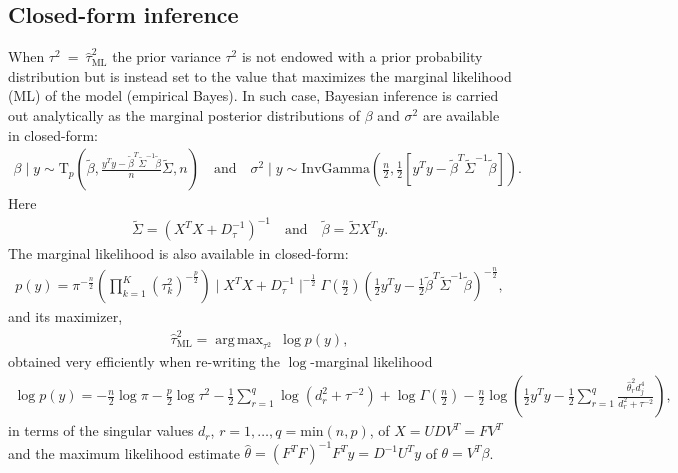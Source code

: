 \documentclass[nojss]{jss}
\DeclareMathOperator*{\argmax}{arg\,max}
\begin{document}
\subsection{Closed-form inference}

When $\tau^2 \ =\  \hat{\tau}_{\mathrm{ML}}^2$ the prior variance $\tau^2$ is
not endowed with a prior probability distribution but is instead set to the
value that maximizes the marginal likelihood (ML) of the model (empirical Bayes).
In such case, Bayesian inference is carried out analytically as the marginal
posterior distributions of $\beta$ and $\sigma^2$ are available in closed-form:
\begin{eqnarray*}
\beta \mid y \sim \mathrm{T}_p \left( \tilde{\beta} ,  \frac{y^T y - \tilde{\beta}^T \tilde{\Sigma}^{-1} \tilde{\beta}}{n} \tilde{\Sigma}, n\right) \quad \mathrm{and} \quad \sigma^2 \mid y \sim \mathrm{InvGamma} \left( \frac{n}{2} , \frac{1}{2} \left[ y^T y - \tilde{\beta}^T \tilde{\Sigma}^{-1} \tilde{\beta} \right] \right).
\end{eqnarray*}
Here
\begin{eqnarray*}
  \tilde{\Sigma} = \left( X^T X + D_{\tau}^{-1}\right)^{-1} \quad \text{and}\quad \tilde{\beta} = \tilde{\Sigma} X^T y.
\end{eqnarray*}
The marginal likelihood is also available in closed-form:
\begin{eqnarray*}
p(y) = \pi^{-\frac{n}{2}} \left(\prod_{k=1}^{K}{(\tau_k^2)^{-\frac{p}{2}}}\right) \mid X^T X + D_{\tau}^{-1} \mid^{-\frac{1}{2}} \Gamma\left( \frac{n}{2} \right) \left( \frac{1}{2} y^T y - \frac{1}{2} \tilde{\beta}^T \tilde{\Sigma}^{-1} \tilde{\beta} \right)^{-\frac{n}{2}},
\end{eqnarray*}
and its maximizer,
\begin{eqnarray*}
\hat{\tau}_{\mathrm{ML}}^2 = \argmax_{\tau^2}\ \log p(y),
\end{eqnarray*}
obtained very efficiently \citep{karabatsos2018} when re-writing the
$\log$-marginal likelihood
\begin{eqnarray*}
\log p(y) = -\frac{n}{2} \log\pi - \frac{p}{2} \log\tau^2 - \frac{1}{2} \sum_{r=1}^{q}{\log(d_r^2 + \tau^{-2})} +\log\Gamma\left( \frac{n}{2}\right) - \frac{n}{2} \log\left( \frac{1}{2}y^Ty - \frac{1}{2}\sum_{r=1}^{q}{\frac{\hat{\theta}_r^2 d_j^4}{d_r^2 + \tau^{-2}}} \right),
\end{eqnarray*}
in terms of the singular values $d_r$, $r=1, \ldots, q=\mathrm{min}(n,p)$, of
$X=UDV^T=F V^T$ and the maximum likelihood estimate
$\hat{\theta} = ( F^T F )^{-1} F^T y=D^{-1}U^T y$ of $\theta = V^T \beta$.
\end{document}
